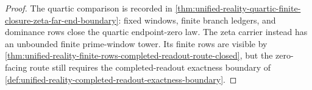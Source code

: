 \begin{proof}
The quartic comparison is recorded in
\autoref{thm:unified-reality-quartic-finite-closure-zeta-far-end-boundary}:
fixed windows, finite branch ledgers, and dominance rows close the
quartic endpoint-zero law.  The zeta carrier instead has an unbounded
finite prime-window tower.  Its finite rows are visible by
\autoref{thm:unified-reality-finite-rows-completed-readout-route-closed},
but the zero-facing route still requires the completed-readout exactness
boundary of
\autoref{def:unified-reality-completed-readout-exactness-boundary}.
\end{proof}

